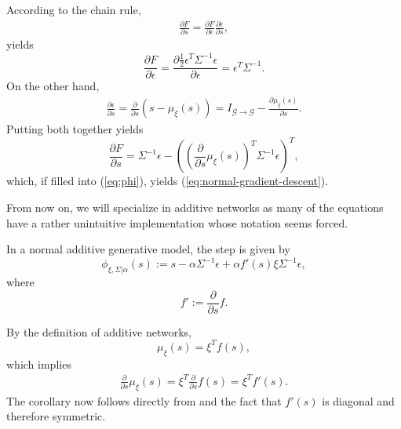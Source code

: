 \documentclass[a4paper,11pt]{report}
\begin{document}
\begin{Bew}
According to the chain rule,
\begin{align*}
\frac{\partial F}{\partial s}=\frac{\partial F}{\partial\epsilon}\frac{\partial\epsilon}{\partial s},
\end{align*}
 yields
\[\frac{\partial F}{\partial\epsilon}=\frac{\partial\frac12\epsilon^T\Sigma^{-1}\epsilon}{\partial\epsilon}=\epsilon^T\Sigma^{-1}.\]
On the other hand, 
\begin{align*}
\frac{\partial\epsilon}{\partial s}=
\frac{\partial}{\partial s}(s-\mu_{\xi}(s))=
I_{\mathcal{G}\to\mathcal{G}}-\frac{\partial\mu_{\xi}(s)}{\partial s}.
\end{align*}
Putting both together yields
\[
\frac{\partial F}{\partial s}=
\Sigma^{-1}\epsilon
-
\left(\left(\frac{\partial}{\partial s}\mu_{\xi}(s)\right)^T\Sigma^{-1}\epsilon\right)^T,
\]
which, if filled into (\ref{eq:phi}), yields (\ref{eq:normal-gradient-descent}).
\end{Bew}

\begin{Par}
From now on, we will specialize in additive networks as many of the equations have a rather unintuitive implementation whose notation seems forced.
\end{Par}

\begin{Cor}\label{grad-desc-add}
In a normal additive generative model, the step is given by
\begin{equation}\label{eq:grad-desc-add}
\phi_{\xi,\Sigma|\alpha}(s):=s-\alpha\Sigma^{-1}\epsilon
+\alpha
f'(s)\xi\Sigma^{-1}\epsilon,
\end{equation}
where
\begin{equation}
f':=\frac{\partial}{\partial s}f.
\end{equation}
\end{Cor}

\begin{Bew}
By the definition of additive networks, 
\[
\mu_{\xi}(s)=\xi^Tf(s),
\]
which implies
\begin{align*}
\frac{\partial}{\partial s}\mu_{\xi}(s)=\xi^T\frac{\partial}{\partial s}f(s)=\xi^Tf'(s).
\end{align*}
The corollary now follows directly from  and the fact that $f'(s)$ is diagonal and therefore symmetric.
\end{Bew}
\end{document}
